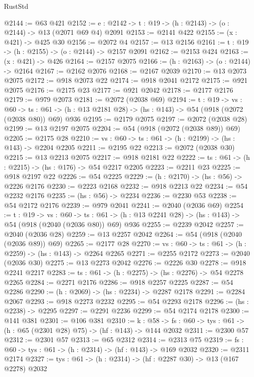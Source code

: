 \begin{lexlean}{RustStd}
\begin{coremodule}
{\begin{coremodule}
{{{{{{{{{{{{{{{{{{{{{{{{{{@2144 := @63 @421
@2152 := {e : @2142} -> {t : @19} -> (h : @2143) -> (o : @2144) -> @13 (@2071 @69 @4) @2091
@2153 := @2141 @422
@2155 := (x : @421) -> @425 @30
@2156 := @2072 @4
@2157 := @13 @2156
@2161 := {t : @19} -> (h : @2155) -> (o : @2144) -> @2157 @2091
@2162 := @2153 @424
@2163 := (x : @421) -> @426
@2164 := @2157 @2075
@2166 := (h : @2163) -> (o : @2144) -> @2164
@2167 := @2162 @2076
@2168 := @2167 @2039
@2170 := @13 @2073 @2075
@2172 := @918 @2073 @22
@2174 := @918 @2041 @2172
@2175 := @921 @2075
@2176 := @2175 @23
@2177 := @921 @2042
@2178 := @2177 @2176
@2179 := @979 @2073
@2181 := @2072 (@2038 @69)
@2194 := {t : @19} ->
  {vs : @60} ->
  {ts : @61} -> (h : @13 @2181 @28) -> (hs : @143) -> @54 (@918 (@2072 (@2038 @80)) @69) @936
@2195 := @2179 @2075
@2197 := @2072 (@2038 @28)
@2199 := @13 @2197 @2075
@2204 := @54 (@918 (@2072 (@2038 @89)) @69)
@2205 := @2175 @28
@2210 := {vs : @60} -> {ts : @61} -> (h : @2199) -> (hs : @143) -> @2204 @2205
@2211 := @2195 @22
@2213 := @2072 (@2038 @30)
@2215 := @13 @2213 @2075
@2217 := @918 @2181 @22
@2222 := {ts : @61} -> (h : @2215) -> (hs : @176) -> @54 @2217 @2205
@2223 := @2211 @23
@2225 := @918 @2197 @22
@2226 := @54 @2225
@2229 := (h : @2170) -> (hs : @56) -> @2226 @2176
@2230 := @2223 @2168
@2232 := @918 @2213 @22
@2234 := @54 @2232 @2176
@2235 := (hs : @56) -> @2234
@2236 := @2230 @53
@2238 := @54 @2172 @2176
@2239 := @979 @2041
@2241 := @2040 (@2036 @69)
@2254 := {t : @19} ->
  {vs : @60} ->
  {ts : @61} -> (h : @13 @2241 @28) -> (hs : @143) -> @54 (@918 (@2040 (@2036 @80)) @69) @936
@2255 := @2239 @2042
@2257 := @2040 (@2036 @28)
@2259 := @13 @2257 @2042
@2264 := @54 (@918 (@2040 (@2036 @89)) @69)
@2265 := @2177 @28
@2270 := {vs : @60} -> {ts : @61} -> (h : @2259) -> (hs : @143) -> @2264 @2265
@2271 := @2255 @2172
@2273 := @2040 (@2036 @30)
@2275 := @13 @2273 @2042
@2276 := @2226 @30
@2278 := @918 @2241 @2217
@2283 := {ts : @61} -> (h : @2275) -> (hs : @2276) -> @54 @2278 @2265
@2284 := @2271 @2176
@2286 := @918 @2257 @2225
@2287 := @54 @2286
@2290 := (h : @2069) -> (hs : @2234) -> @2287 @2178
@2291 := @2284 @2067
@2293 := @918 @2273 @2232
@2295 := @54 @2293 @2178
@2296 := (hs : @2238) -> @2295
@2297 := @2291 @2236
@2299 := @54 @2174 @2178
@2300 := @141 @381
@2301 := @106 @381
@2310 := {k : @58} ->
  {fs : @60} -> {tys : @61} -> (h : @65 (@2301 @28) @75) -> (hf : @143) -> @144 @2032
@2311 := @2300 @57
@2312 := @2301 @57
@2313 := @65 @2312
@2314 := @2313 @75
@2319 := {fs : @60} -> {tys : @61} -> (h : @2314) -> (hf : @143) -> @169 @2032
@2320 := @2311 @2174
@2327 := {tys : @61} -> (h : @2314) -> (hf : @2287 @30) -> @13 (@167 @2278) @2032
}}}}}}}}}}}}}}}}}}}}}}}}}}
\end{coremodule}}
\end{coremodule}
\end{lexlean}
